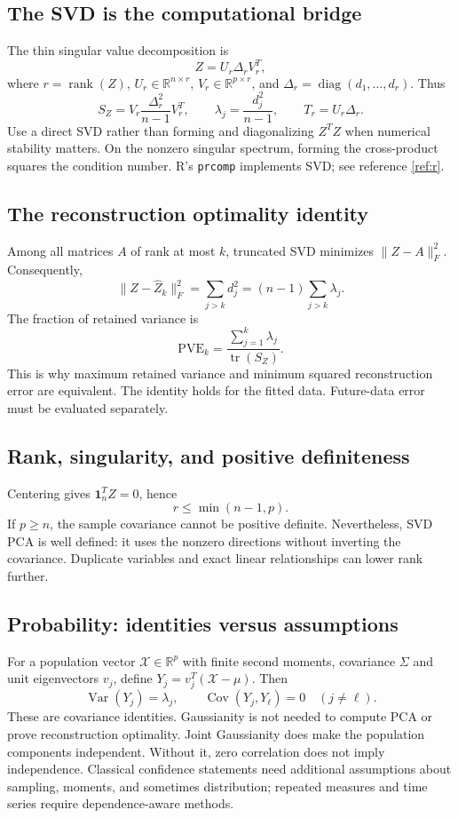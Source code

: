 \documentclass[11pt]{article}
\newcommand{\R}{\mathbb R}\newcommand{\tr}{\operatorname{tr}}\newcommand{\Cov}{\operatorname{Cov}}
\begin{document}
\subsection{The SVD is the computational bridge}
The thin singular value decomposition is
\[
Z=U_r\Delta_rV_r^T,
\]
where $r=\operatorname{rank}(Z)$, $U_r\in\R^{n\times r}$, $V_r\in\R^{p\times r}$, and $\Delta_r=\operatorname{diag}(d_1,\ldots,d_r)$. Thus
\[
S_Z=V_r\frac{\Delta_r^2}{n-1}V_r^T,\qquad
\lambda_j=\frac{d_j^2}{n-1},\qquad T_r=U_r\Delta_r.
\]
Use a direct SVD rather than forming and diagonalizing $Z^TZ$ when numerical stability matters. On the nonzero singular spectrum, forming the cross-product squares the condition number. R's \texttt{prcomp} implements SVD; see reference \ref{ref:r}.

\subsection{The reconstruction optimality identity}
Among all matrices $A$ of rank at most $k$, truncated SVD minimizes $\|Z-A\|_F^2$. Consequently,
\[
\|Z-\widehat Z_k\|_F^2=\sum_{j>k}d_j^2
=(n-1)\sum_{j>k}\lambda_j.
\]
The fraction of retained variance is
\[
\mathrm{PVE}_k=\frac{\sum_{j=1}^{k}\lambda_j}{\tr(S_Z)}.
\]
This is why maximum retained variance and minimum squared reconstruction error are equivalent. The identity holds for the fitted data. Future-data error must be evaluated separately.

\subsection{Rank, singularity, and positive definiteness}
Centering gives $\bm1_n^TZ=0$, hence
\[
r\le\min(n-1,p).
\]
If $p\ge n$, the sample covariance cannot be positive definite. Nevertheless, SVD PCA is well defined: it uses the nonzero directions without inverting the covariance. Duplicate variables and exact linear relationships can lower rank further.

\subsection{Probability: identities versus assumptions}
For a population vector $\mathcal X\in\R^p$ with finite second moments, covariance $\Sigma$ and unit eigenvectors $v_j$, define $Y_j=v_j^T(\mathcal X-\mu)$. Then
\[
\operatorname{Var}(Y_j)=\lambda_j,\qquad
\Cov(Y_j,Y_\ell)=0\quad(j\ne\ell).
\]
These are covariance identities. Gaussianity is not needed to compute PCA or prove reconstruction optimality. Joint Gaussianity does make the population components independent. Without it, zero correlation does not imply independence. Classical confidence statements need additional assumptions about sampling, moments, and sometimes distribution; repeated measures and time series require dependence-aware methods.
\end{document}
